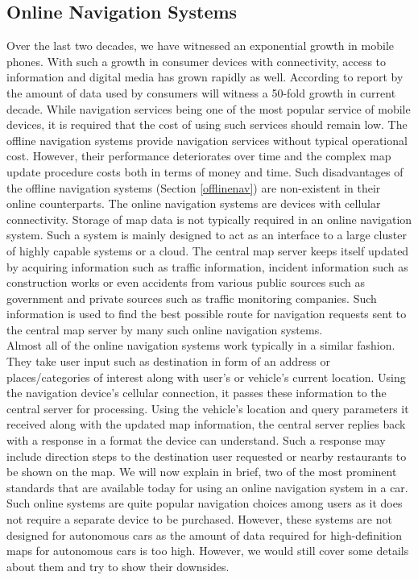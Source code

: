 \subsection{Online Navigation Systems}
Over the last two decades, we have witnessed an exponential growth in mobile phones. With such a growth in consumer devices with connectivity, access to information and digital media has grown rapidly as well. According to report by \citet{gantz2012digital} the amount of data used by consumers will witness a 50-fold growth in current decade. While navigation services being one of the most popular service of mobile devices, it is required that the cost of using such services should remain low. The offline navigation systems provide navigation services without typical operational cost. However, their performance deteriorates over time and the complex map update procedure costs both in terms of money and time. Such disadvantages of the offline navigation systems (Section \ref{offlinenav}) are non-existent in their online counterparts. The online navigation systems are devices with cellular connectivity. Storage of map data is not typically required in an online navigation system. Such a system is mainly designed to act as an interface to a large cluster of highly capable systems or a cloud. The central map server keeps itself updated by acquiring information such as traffic information, incident information such as construction works or even accidents from various public sources such as government and private sources such as traffic monitoring companies. Such information is used to find the best possible route for navigation requests sent to the central map server by many such online navigation systems. \\

Almost all of the online navigation systems work typically in a similar fashion. They take user input such as destination in form of an address or places/categories of interest along with user's or vehicle's current location. Using the navigation device's cellular connection, it passes these information to the central server for processing. Using the vehicle's location and query parameters it received along with the updated map information, the central server replies back with a response in a format the device can understand. Such a response may include direction steps to the destination user requested or nearby restaurants to be shown on the map. 
We will now explain in brief, two of the most prominent standards that are available today for using an online navigation system in a car. Such online systems are quite popular navigation choices among users as it does not require a separate device to be purchased. However, these systems are not designed for autonomous cars as the amount of data required for high-definition maps for autonomous cars is too high. However, we would still cover some details about them and try to show their downsides.

